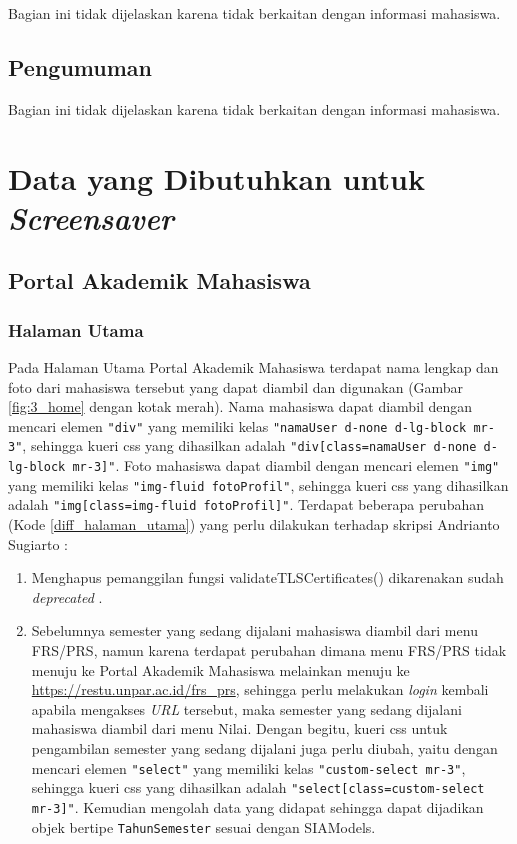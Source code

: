 Bagian ini tidak dijelaskan karena tidak berkaitan dengan informasi mahasiswa.

\subsection{Pengumuman}

Bagian ini tidak dijelaskan karena tidak berkaitan dengan informasi mahasiswa.

\section{Data yang Dibutuhkan untuk \textit{Screensaver}}

\subsection{Portal Akademik Mahasiswa}

\subsubsection{Halaman Utama}
Pada Halaman Utama Portal Akademik Mahasiswa terdapat nama lengkap dan foto dari mahasiswa tersebut yang dapat diambil dan digunakan (Gambar \ref{fig:3_home} dengan kotak merah). Nama mahasiswa dapat diambil dengan mencari elemen \texttt{"div"} yang memiliki kelas \texttt{"namaUser d-none d-lg-block mr-3"}, sehingga kueri css yang dihasilkan adalah \texttt{"div[class=namaUser d-none d-lg-block mr-3]"}. Foto mahasiswa dapat diambil dengan mencari elemen \texttt{"img"} yang memiliki kelas \texttt{"img-fluid fotoProfil"}, sehingga kueri css yang dihasilkan adalah \texttt{"img[class=img-fluid fotoProfil]"}.
Terdapat beberapa perubahan (Kode \ref{diff_halaman_utama}) yang perlu dilakukan terhadap skripsi Andrianto Sugiarto \cite{ifstupor}: 

\begin{enumerate}
    \item Menghapus pemanggilan fungsi validateTLSCertificates() dikarenakan sudah \textit{deprecated} \cite{jsoup}.
    \item Sebelumnya semester yang sedang dijalani mahasiswa diambil dari menu FRS/PRS, namun karena terdapat perubahan dimana menu FRS/PRS tidak menuju ke Portal Akademik Mahasiswa melainkan menuju ke \url{https://restu.unpar.ac.id/frs_prs}, sehingga perlu melakukan \textit{login} kembali apabila mengakses \textit{URL} tersebut, maka semester yang sedang dijalani mahasiswa diambil dari menu Nilai. Dengan begitu, kueri css untuk pengambilan semester yang sedang dijalani juga perlu diubah, yaitu dengan mencari elemen \texttt{"select"} yang memiliki kelas \texttt{"custom-select mr-3"}, sehingga kueri css yang dihasilkan adalah \texttt{"select[class=custom-select mr-3]"}. Kemudian mengolah data yang didapat sehingga dapat dijadikan objek bertipe \texttt{TahunSemester} sesuai dengan SIAModels.
\end{enumerate}

